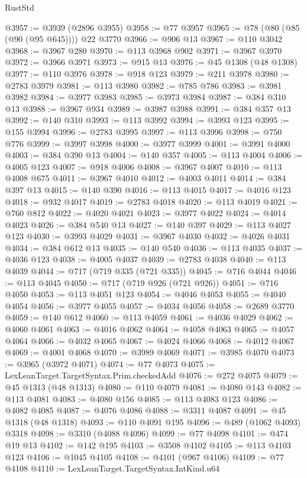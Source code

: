 \begin{lexlean}{RustStd}
\begin{coremodule}
@3957 := @3939 (@2896 @3955)
@3958 := @77 @3957
@3965 := @78 (@80 (@85 (@90 (@95 @645)))) @22 @3770
@3966 := @906 @13
@3967 := @110 @3042
@3968 := @3967 @280
@3970 := @113 @3968 @902
@3971 := @3967 @3970
@3972 := @3966 @3971
@3973 := @915 @13
@3976 := @45 @1308 (@48 @1308)
@3977 := @110 @3976
@3978 := @918 @123
@3979 := @211 @3978
@3980 := @2783 @3979
@3981 := @113 @3980
@3982 := @785 @786
@3983 := @3981 @3982
@3984 := @3977 @3983
@3985 := @3973 @3984
@3987 := @384 @310 @13
@3988 := @3967 @934
@3989 := @3987 @3988
@3991 := @384 @357 @13
@3992 := @140 @310
@3993 := @113 @3992
@3994 := @3993 @123
@3995 := @155 @3994
@3996 := @2783 @3995
@3997 := @113 @3996
@3998 := @750 @776
@3999 := @3997 @3998
@4000 := @3977 @3999
@4001 := @3991 @4000
@4003 := @384 @390 @13
@4004 := @140 @357
@4005 := @113 @4004
@4006 := @4005 @123
@4007 := @918 @4006
@4008 := @3967 @4007
@4010 := @113 @4008 @675
@4011 := @3967 @4010
@4012 := @4003 @4011
@4014 := @384 @397 @13
@4015 := @140 @390
@4016 := @113 @4015
@4017 := @4016 @123
@4018 := @932 @4017
@4019 := @2783 @4018
@4020 := @113 @4019
@4021 := @760 @812
@4022 := @4020 @4021
@4023 := @3977 @4022
@4024 := @4014 @4023
@4026 := @384 @540 @13
@4027 := @140 @397
@4029 := @113 @4027 @123
@4030 := @3993 @4029
@4031 := @3967 @4030
@4032 := @4026 @4031
@4034 := @384 @612 @13
@4035 := @140 @540
@4036 := @113 @4035
@4037 := @4036 @123
@4038 := @4005 @4037
@4039 := @2783 @4038
@4040 := @113 @4039
@4044 := @717 (@719 @335 (@721 @335))
@4045 := @716 @4044
@4046 := @113 @4045
@4050 := @717 (@719 @926 (@721 @926))
@4051 := @716 @4050
@4053 := @113 @4051 @123
@4054 := @4046 @4053
@4055 := @4040 @4054
@4056 := @3977 @4055
@4057 := @4034 @4056
@4058 := @2689 @3770
@4059 := @140 @612
@4060 := @113 @4059
@4061 := @4036 @4029
@4062 := @4060 @4061
@4063 := @4016 @4062
@4064 := @4058 @4063
@4065 := @4057 @4064
@4066 := @4032 @4065
@4067 := @4024 @4066
@4068 := @4012 @4067
@4069 := @4001 @4068
@4070 := @3989 @4069
@4071 := @3985 @4070
@4073 := @3965 (@3972 @4071)
@4074 := @77 @4073
@4075 := LexLeanTarget.TargetSyntax.Prim.checkedAdd
@4076 := @272 @4075
@4079 := @45 @1313 (@48 @1313)
@4080 := @110 @4079
@4081 := @4080 @143
@4082 := @113 @4081
@4083 := @4080 @156
@4085 := @113 @4083 @123
@4086 := @4082 @4085
@4087 := @4076 @4086
@4088 := @3311 @4087
@4091 := @45 @1318 (@48 @1318)
@4093 := @110 @4091 @195
@4096 := @489 (@1062 @4093) @3318
@4098 := @3310 (@4088 @4096)
@4099 := @77 @4098
@4101 := @474 @19 @13
@4102 := @142 @195
@4103 := @3508 @4102
@4105 := @113 @4103 @123
@4106 := @1045 @4105
@4108 := @4101 (@967 @4106)
@4109 := @77 @4108
@4110 := LexLeanTarget.TargetSyntax.IntKind.u64

\end{coremodule}
\end{lexlean}
